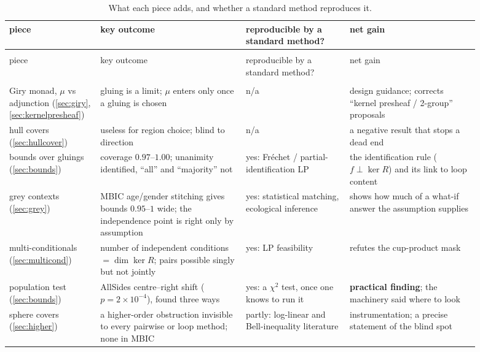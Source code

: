 \documentclass[11pt]{article}
\theoremstyle{definition}
\theoremstyle{remark}
\begin{document}
{\footnotesize
\setlength{\tabcolsep}{3.5pt}
\begin{longtable}{>{\raggedright\arraybackslash}p{0.15\linewidth}>{\raggedright\arraybackslash}p{0.29\linewidth}>{\raggedright\arraybackslash}p{0.2\linewidth}>{\raggedright\arraybackslash}p{0.25\linewidth}}
\caption{What each piece adds, and whether a standard method reproduces it.}\label{tab:net}\\
\toprule
piece & key outcome & reproducible by a standard method? & net gain\\
\midrule
\endfirsthead
\multicolumn{4}{l}{\emph{Table~\ref{tab:net}, continued}}\\
\toprule
piece & key outcome & reproducible by a standard method? & net gain\\
\midrule
\endhead
\midrule\multicolumn{4}{r}{\emph{continued on the next page}}\\
\endfoot
\bottomrule
\endlastfoot
Giry monad, $\mu$ vs adjunction (\ref{sec:giry}, \ref{sec:kernelpresheaf}) & gluing is a limit; $\mu$ enters only once a gluing is chosen & n/a & design guidance; corrects ``kernel presheaf / 2-group'' proposals\\
hull covers (\ref{sec:hullcover}) & useless for region choice; blind to direction & n/a & a negative result that stops a dead end\\
bounds over gluings (\ref{sec:bounds}) & coverage $0.97$--$1.00$; unanimity identified, ``all'' and ``majority'' not & yes: Fr\'echet / partial-identification LP & the identification rule ($f\perp\ker R$) and its link to loop content\\
grey contexts (\ref{sec:grey}) & MBIC age/gender stitching gives bounds $0.95$--$1$ wide; the independence point is right only by assumption & yes: statistical matching, ecological inference & shows how much of a what-if answer the assumption supplies\\
multi-conditionals (\ref{sec:multicond}) & number of independent conditions $=\dim\ker R$; pairs possible singly but not jointly & yes: LP feasibility & refutes the cup-product mask\\
population test (\ref{sec:bounds}) & AllSides centre--right shift ($p=2\times10^{-4}$), found three ways & yes: a $\chi^2$ test, once one knows to run it & \textbf{practical finding}; the machinery said where to look\\
sphere covers (\ref{sec:higher}) & a higher-order obstruction invisible to every pairwise or loop method; none in MBIC & partly: log-linear and Bell-inequality literature & instrumentation; a precise statement of the blind spot\\

\end{longtable}}
\end{document}
